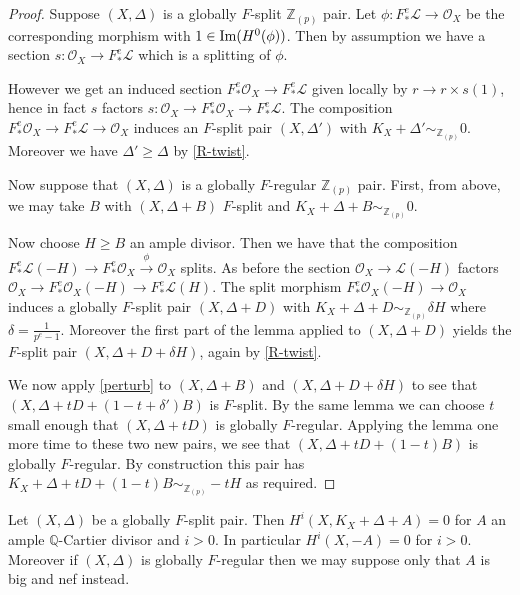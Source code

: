 \documentclass[a4paper,12pt]{book}
\newcommand{\Fe}[1][e]{F^{#1}_{*}}
\newcommand{\im}{\textup{Im}}
\newcommand{\ox}[1][X]{\mathcal{O}_{#1}}
\newcommand{\zp}{\mathbb{Z}_{(p)}}
\begin{document}
\begin{proof}
	Suppose $(X,\Delta)$ is a globally $F$-split $\zp$ pair. Let $\phi:F_{*}^{e}\mathcal{L} \to \ox$ be the corresponding morphism with $1 \in \im(H^{0}(\phi))$. Then by assumption we have a section $s:\ox \to F_{*}^{e}\mathcal{L}$ which is a splitting of $\phi$. 
	
	However we get an induced section $F_{*}^{e} \ox \to F_{*}^{e}\mathcal{L}$ given locally by $r \to r\times s(1)$, hence in fact $s$ factors $s: \ox \to F_{*}^{e}\ox \to F_{*}^{e}\mathcal{L}$. The composition $\Fe \ox \to \Fe \mathcal{L} \to \ox$ induces an $F$-split pair $(X,\Delta')$ with $K_{X}+\Delta' \sim_{\zp} 0$. Moreover we have $\Delta' \geq \Delta$ by \autoref{R-twist}.
		
	Now suppose that $(X,\Delta)$ is a globally $F$-regular $\zp$ pair. First, from above, we may take $B$ with $(X,\Delta+B)$ $F$-split and $K_{X}+\Delta+B \sim_{\zp} 0$.
	
	Now choose $H\geq B$ an ample divisor. Then we have that the composition $\Fe \mathcal{L}(-H) \to \Fe \ox \xrightarrow{\phi} \ox$ splits. As before the section $\ox \to \mathcal{L}(-H)$ factors $\ox \to \Fe\ox(-H) \to \Fe \mathcal{L}(H)$. The split morphism $\Fe\ox(-H) \to \ox$ induces a globally $F$-split pair $(X,\Delta+D)$ with $K_{X}+\Delta+D \sim_{\zp} \delta H$ where $\delta=\frac{1}{p^{e}-1}$. Moreover the first part of the lemma applied to $(X,\Delta+D)$ yields the $F$-split pair $(X,\Delta+D+\delta H)$, again by \autoref{R-twist}.
	
	We now apply \autoref{perturb} to $(X,\Delta+B)$ and $(X,\Delta+D+\delta H)$ to see that $(X,\Delta+ tD + (1-t+\delta')B)$ is $F$-split. By the same lemma we can choose $t$ small enough that $(X,\Delta+tD)$ is globally $F$-regular. Applying the lemma one more time to these two new pairs, we see that $(X,\Delta+tD+(1-t)B)$ is globally $F$-regular. By construction this pair has $K_{X}+\Delta+tD+(1-t)B \sim_{\zp} -tH$ as required. 
		
\end{proof}

\begin{lemma}
	
	Let $(X,\Delta)$ be a globally $F$-split pair. Then $H^{i}(X,K_{X}+\Delta+A)=0$ for $A$ an ample $\mathbb{Q}$-Cartier divisor and $i> 0$. In particular $H^{i}(X,-A)=0$ for $i> 0$. Moreover if $(X,\Delta)$ is globally $F$-regular then we may suppose only that $A$ is big and nef instead.
	
	\end{lemma}
\end{document}
